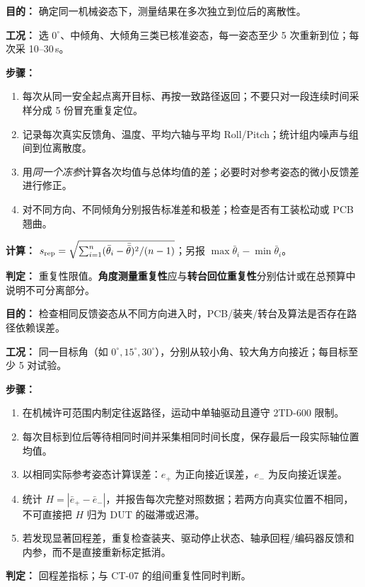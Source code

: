 \textbf{目的：} 确定同一机械姿态下，测量结果在多次独立到位后的离散性。
\par\textbf{工况：} 选 $0^\circ$、中倾角、大倾角三类已核准姿态，每一姿态至少 5 次重新到位；每次采 10--30\,s。
\par\textbf{步骤：}
\begin{enumerate}
\item 每次从同一安全起点离开目标、再按一致路径返回；不要只对一段连续时间采样分成 5 份冒充重复定位。
\item 记录每次真实反馈角、温度、平均六轴与平均 Roll/Pitch；统计组内噪声与组间到位离散度。
\item 用\emph{同一个冻参}计算各次均值与总体均值的差；必要时对参考姿态的微小反馈差进行修正。
\item 对不同方向、不同倾角分别报告标准差和极差；检查是否有工装松动或 PCB 翘曲。
\end{enumerate}
\textbf{计算：} $s_{\rm rep}=\sqrt{\sum_{i=1}^{n}(\bar\theta_i-\bar{\bar\theta})^2/(n-1)}$；另报 $\max\bar\theta_i-\min\bar\theta_i$。
\par\textbf{判定：} 重复性限值\pending。\textbf{角度测量重复性}应与\textbf{转台回位重复性}分别估计或在总预算中说明不可分离部分。

\textbf{目的：} 检查相同反馈姿态从不同方向进入时，PCB/装夹/转台及算法是否存在路径依赖误差。
\par\textbf{工况：} 同一目标角（如 $0^\circ,15^\circ,30^\circ$），分别从较小角、较大角方向接近；每目标至少 5 对试验。
\par\textbf{步骤：}
\begin{enumerate}
\item 在机械许可范围内制定往返路径，运动中单轴驱动且遵守 2TD-600 限制。
\item 每次目标到位后等待相同时间并采集相同时间长度，保存最后一段实际轴位置均值。
\item 以相同实际参考姿态计算误差：$e_{+}$ 为正向接近误差，$e_{-}$ 为反向接近误差。
\item 统计 $H=|\bar e_{+}-\bar e_{-}|$，并报告每次完整对照数据；若两方向真实位置不相同，不可直接把 $H$ 归为 DUT 的磁滞或迟滞。
\item 若发现显著回程差，重复检查装夹、驱动停止状态、轴承回程/编码器反馈和内参，而不是直接重新标定抵消。
\end{enumerate}
\textbf{判定：} 回程差指标\pending；与 CT-07 的组间重复性同时判断。

